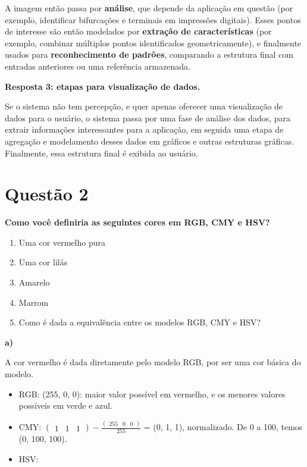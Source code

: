 \documentclass[12pt]{article}
\begin{document}
A imagem então passa por \textbf{análise}, que depende da aplicação em questão (por exemplo, identificar bifurcações e terminais em impressões digitais). Esses pontos de interesse são então modelados por \textbf{extração de características} (por exemplo, combinar múltiplos pontos identificados geometricamente), e finalmente usados para \textbf{reconhecimento de padrões}, comparando a estrutura final com entradas anteriores ou uma referência armazenada.

\bigskip
\textbf{Resposta 3: etapas para visualização de dados.}

Se o sistema não tem percepção, e quer apenas oferecer uma visualização de dados para o usuário, o sistema passa por uma fase de análise dos dados, para extrair informações interessantes para a aplicação, em seguida uma etapa de agregação e modelamento desses dados em gráficos e outras estruturas gráficas. Finalmente, essa estrutura final é exibida ao usuário.

\section*{Questão 2}
{\bfseries Como você definiria as seguintes cores em RGB, CMY e HSV?

\begin{enumerate}[label=\alph*)]
    \item Uma cor vermelho pura
    \item Uma cor lilás
    \item Amarelo
    \item Marrom
    \item Como é dada a equivalência entre os modelos RGB, CMY e HSV?
\end{enumerate}
}

\textbf{a)}

A cor vermelho é dada diretamente pelo modelo RGB, por ser uma cor básica do modelo.

\bigskip
\begin{itemize}
    \item RGB: (255, 0, 0): maior valor possível em vermelho, e os menores valores possíveis em verde e azul.
    \item CMY: $\begin{pmatrix}1 & 1 & 1\end{pmatrix} - \frac{\begin{pmatrix}255 & 0 & 0\end{pmatrix}}{255}$ = (0, 1, 1), normalizado. De 0 a 100, temos (0, 100, 100).
    \item HSV:
\end{itemize}{}
\end{document}
